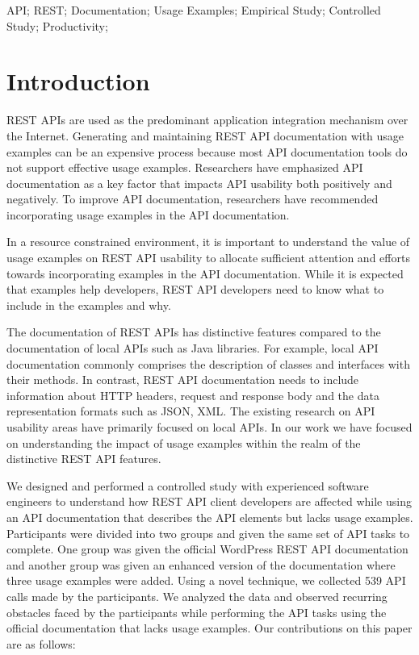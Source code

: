 \documentclass[conference]{IEEEtran}
\begin{document}
\begin{IEEEkeywords}
API; REST; Documentation; Usage Examples; Empirical Study; Controlled Study; Productivity;

\end{IEEEkeywords}

\IEEEpeerreviewmaketitle


\section{Introduction}
REST APIs are used as the predominant application integration mechanism over the Internet. Generating and maintaining REST API documentation with usage examples can be an expensive process because most API documentation tools do not support effective usage examples. Researchers have emphasized API documentation as a key factor that impacts API usability both positively and negatively. To improve API documentation, researchers have recommended incorporating usage examples in the API documentation.

In a resource constrained environment, it is important to understand the value of usage examples on REST API usability to allocate sufficient attention and efforts towards incorporating examples in the API documentation. While it is expected that examples help developers, REST API developers need to know what to include in the examples and why.

The documentation of REST APIs has distinctive features compared to the documentation of local APIs such as Java libraries. For example, local API documentation commonly comprises the description of classes and interfaces with their methods. In contrast, REST API documentation needs to include information about HTTP headers, request and response body and the data representation formats such as JSON, XML. The existing research on API usability areas have primarily focused on local APIs. In our work we have focused on understanding the impact of usage examples within the realm of the distinctive REST API features.

We designed and performed a controlled study with experienced software engineers to understand how REST API client developers are affected while using an API documentation that describes the API elements but lacks usage examples. Participants were divided into two groups and given the same set of API tasks to complete. One group was given the official WordPress REST API documentation and another group was given an enhanced version of the documentation where three usage examples were added. Using a novel technique, we collected 539 API calls made by the participants. We analyzed the data and observed recurring obstacles faced by the participants while performing the API tasks using the official documentation that lacks usage examples. Our contributions on this paper are as follows:
\end{document}
